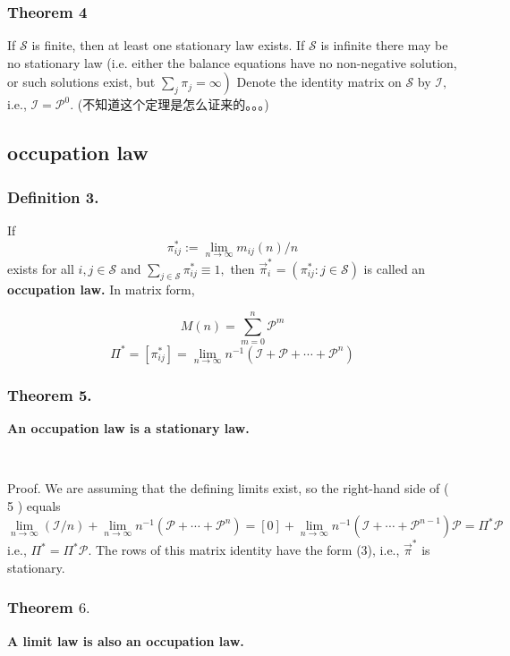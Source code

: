 \documentclass[UTF8]{ctexart}
\begin{document}
\subsubsection{Theorem 4} If $\mathcal{S}$ is finite, then at least one stationary law exists. If $\mathcal{S}$ is infinite there may be no stationary law (i.e. either the balance equations have no non-negative solution, or such solutions exist, but $\left.\sum_{j} \pi_{j}=\infty\right)$
Denote the identity matrix on $\mathcal{S}$ by $\mathcal{I},$ i.e., $\mathcal{I}=\mathcal{P}^{0}$.
(不知道这个定理是怎么证来的。。。)

\subsection{occupation law} 

\subsubsection{Definition 3.} If
$$
\pi_{i j}^{*}:=\lim _{n \rightarrow \infty} m_{i j}(n) / n
$$
exists for all $i, j \in \mathcal{S}$ and $\sum_{j \in \mathcal{S}} \pi_{i j}^{*} \equiv 1,$ then $\vec{\pi}_{i}^{*}=\left(\pi_{i j}^{*}: j \in \mathcal{S}\right)$ is called an \textbf{occupation law.} In matrix form,


$$
M(n)=\sum_{m=0}^{n} \mathcal{P}^{m}
$$
$$
\Pi^{*}=\left[\pi_{i j}^{*}\right]=\lim _{n \rightarrow \infty} n^{-1}\left(\mathcal{I}+\mathcal{P}+\cdots+\mathcal{P}^{n}\right)
$$

\subsubsection{Theorem 5.} \textbf{An occupation law is a stationary law.}

\

Proof. We are assuming that the defining limits exist, so the right-hand side of ( 5 ) equals
$$
\lim _{n \rightarrow \infty}(\mathcal{I} / n)+\lim _{n \rightarrow \infty} n^{-1}\left(\mathcal{P}+\cdots+\mathcal{P}^{n}\right)=[0]+\lim _{n \rightarrow \infty} n^{-1}\left(\mathcal{I}+\cdots+\mathcal{P}^{n-1}\right) \mathcal{P}=\Pi^{*} \mathcal{P}
$$
i.e., $\Pi^{*}=\Pi^{*} \mathcal{P}$. The rows of this matrix identity have the form (3), i.e., $\vec{\pi}^{*}$ is stationary.

\subsubsection{Theorem $6 .$} \textbf{A limit law is also an occupation law.}
\end{document}
